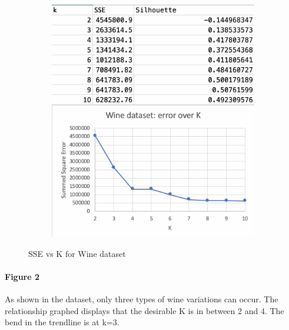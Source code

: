 \documentclass{article}
\begin{document}
\begin{figure}[h!]
  \centering
  \begin{subfigure}[b]{.6\linewidth}
    \includegraphics[width=\linewidth]{two.jpg}
  \end{subfigure}
  \caption{SSE vs K for Wine dataset }

  \end{figure}
        \paragraph{Figure 2}

    As shown in the dataset, only three types of wine variations can occur. The relationship graphed displays that the desirable K is in between 2 and 4. The bend in the trendline is at k=3.
\end{document}
